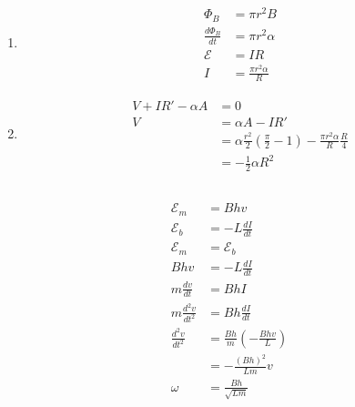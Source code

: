 \documentclass{article}
\begin{document}
\subsection{}

\begin{enumerate}
  \item

        \begin{align*}
          \Phi_B               & = \pi r^2 B                \\
          \frac{d \Phi_B}{d t} & = \pi r^2 \alpha           \\
          \mathcal{E}          & = I R                      \\
          I                    & = \frac{\pi r^2 \alpha}{R}
        \end{align*}

  \item

        \begin{align*}
          V + I R' - \alpha A & = 0                                                                                            \\
          V                   & = \alpha A - I R'                                                                              \\
                              & = \alpha \frac{r^2}{2} \left( \frac{\pi}{2} - 1 \right) - \frac{\pi r^2 \alpha}{R} \frac{R}{4} \\
                              & = -\frac{1}{2} \alpha R^2
        \end{align*}
\end{enumerate}

\subsection{}

\begin{align*}
  \mathcal{E}_m         & = B h v                                         \\
  \mathcal{E}_b         & = -L \frac{d I}{d t}                            \\
  \mathcal{E}_m         & = \mathcal{E}_b                                 \\
  B h v                 & = -L \frac{d I}{d t}                            \\
  m \frac{d v}{d t}     & = B h I                                         \\
  m \frac{d^2 v}{d t^2} & = B h \frac{d I}{d t}                           \\
  \frac{d^2 v}{d t^2}   & = \frac{B h}{m} \left( -\frac{B h v}{L} \right) \\
                        & = -\frac{(B h)^2}{L m} v                        \\
  \omega                & = \frac{B h}{\sqrt{L m}}
\end{align*}
\end{document}
